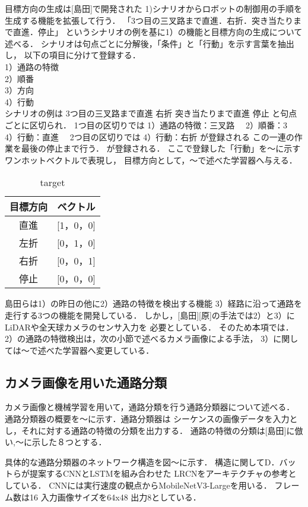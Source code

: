 \documentclass{sice-si}
\begin{document}
目標方向の生成は[島田]で開発された
1)シナリオからロボットの制御用の手順を生成する機能を拡張して行う．
「3つ目の三叉路まで直進．右折．突き当たりまで直進．停止」
というシナリオの例を基に1）の機能と目標方向の生成について述べる．
シナリオは句点ごとに分解後，「条件」と「行動」を示す言葉を抽出し，
以下の項目に分けて登録する．\\
1）通路の特徴\\
2）順番\\
3）方向\\
4）行動\\
シナリオの例は
3つ目の三叉路まで直進
右折
突き当たりまで直進
停止
と句点ごとに区切られ．
1つ目の区切りでは
1）通路の特徴：三叉路　
2）順番：3　
4）行動：直進　
2つ目の区切りでは
4）行動：右折
が登録される
この一連の作業を最後の停止まで行う．
が登録される．
ここで登録した「行動」を〜に示すワンホットベクトルで表現し，
目標方向として，〜で述べた学習器へ与える．

\begin{table}[]
    \centering
    \caption{target}
    \begin{tabular}{cc}
    \hline
    目標方向 & ベクトル        \\
    \hline
    直進   & {[}1，0，0{]} \\
    左折   & {[}0，1，0{]} \\
    右折   & {[}0，0，1{]} \\
    停止   & {[}0，0，0{]}\\
    \hline
    \end{tabular}
    \end{table}

\par
島田らは1）の昨日の他に2）通路の特徴を検出する機能
3）経路に沿って通路を走行する3つの機能を開発している．
しかし，[島田][原]の手法では2）と3）にLiDARや全天球カメラのセンサ入力を
必要としている．
そのため本項では．
2）の通路の特徴検出は，次の小節で述べるカメラ画像による手法，
3）に関しては〜で述べた学習器へ変更している．
\subsection{カメラ画像を用いた通路分類}
カメラ画像と機械学習を用いて，通路分類を行う通路分類器について述べる．
通路分類器の概要を〜に示す．通路分類器は
シーケンスの画像データを入力とし，それに対する通路の特徴の分類を出力する．
通路の特徴の分類は[島田]に倣い,〜に示した８つとする．

\par
具体的な通路分類器のネットワーク構造を図〜に示す．
構造に関してD．バットらが提案するCNNとLSTMを組み合わせた
LRCNをアーキテクチャの参考としている．
CNNには実行速度の観点からMobileNetV3-Largeを用いる．
フレーム数は16 入力画像サイズを64x48 出力8としている．
\end{document}
